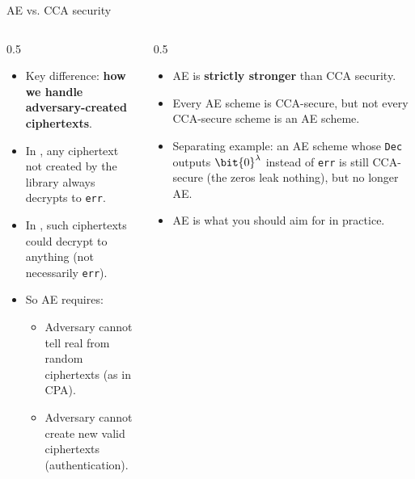 \ifdefined\PRESENTATION\else\PassOptionsToClass{handout}{beamer}\fi\documentclass[aspectratio=169, lualatex]{beamer}
\begin{document}
\begin{frame}{AE vs. CCA security}
	\begin{columns}[c]
		\begin{column}{0.5\textwidth}
			\begin{itemize}[<+->]
				\item Key difference: \textbf{how we handle adversary-created ciphertexts}.
				\item In , any ciphertext not created by the library always decrypts to \texttt{err}.
				\item In , such ciphertexts could decrypt to anything (not necessarily \texttt{err}).
				\item So AE requires:
				      \begin{itemize}
					      \item Adversary cannot tell real from random ciphertexts (as in CPA).
					      \item Adversary cannot create new valid ciphertexts (authentication).
				      \end{itemize}
			\end{itemize}
		\end{column}
		\begin{column}{0.5\textwidth}
			\begin{itemize}[<+->]
				\item AE is \textbf{strictly stronger} than CCA security.
				\item Every AE scheme is CCA-secure, but not every CCA-secure scheme is an AE scheme.
				\item Separating example: an AE scheme whose \texttt{Dec} outputs $\bit{0}^\lambda$ instead of \texttt{err} is still CCA-secure (the zeros leak nothing), but no longer AE.
				\item AE is what you should aim for in practice.
			\end{itemize}
		\end{column}
	\end{columns}
\end{frame}
\end{document}
